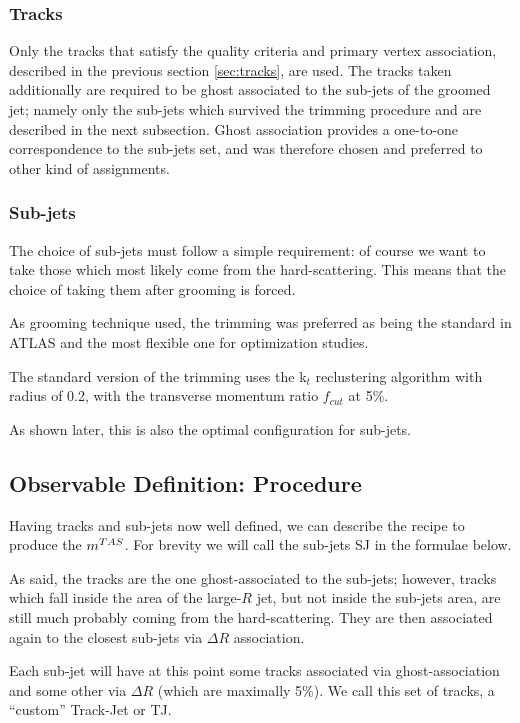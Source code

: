 \subsubsection{Tracks}
Only the tracks that satisfy the quality criteria and primary vertex association, described in the previous section \ref{sec:tracks}, are used.
The tracks taken additionally are required to be ghost associated to the sub-jets of the groomed jet; namely only the sub-jets which survived the trimming procedure and are described in the next subsection.
Ghost association provides a one-to-one correspondence to the sub-jets set, and was therefore chosen and preferred to other kind of assignments.

\subsubsection{Sub-jets}

The choice of sub-jets must follow a simple requirement: of course we want to take those which most likely come from the hard-scattering. This means that the choice of taking them after grooming is forced.

As grooming technique used, the trimming was preferred as being the standard in ATLAS and the most flexible one for optimization studies.

The standard version of the trimming uses the k$_t$ reclustering algorithm with radius of 0.2, with the transverse momentum ratio $f_{cut}$ at 5\%.

As shown later, this is also the optimal configuration for sub-jets.

\subsection{Observable Definition: Procedure}
Having tracks and sub-jets now well defined, we can describe the recipe to produce the $m^{TAS}$. For brevity we will call the sub-jets SJ in the formulae below. 

As said, the tracks are the one ghost-associated to the sub-jets; however, tracks which fall inside the area of the large-$R$ jet, but not inside the sub-jets area, are still much probably coming from the hard-scattering. They are then associated again to the closest sub-jets via $\Delta R$ association.

Each sub-jet will have at this point some tracks associated via ghost-association and some other via $\Delta R$ (which are maximally 5\%). We call this set of tracks, a ``custom'' Track-Jet or TJ.

